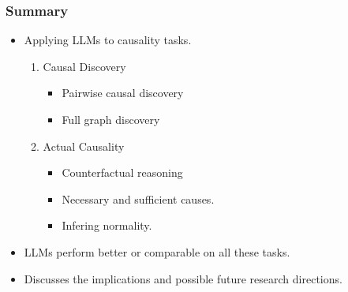 \documentclass{beamer}
\begin{document}
\begin{frame}
	\frametitle{Summary}
	\begin{itemize}
		\item Applying LLMs to causality tasks.
		\begin{enumerate}
			\item Causal Discovery
				\begin{itemize}
					\item Pairwise causal discovery
					\item Full graph discovery
				\end{itemize}
			\item Actual Causality
				\begin{itemize}
					\item Counterfactual reasoning
					\item Necessary and sufficient causes.
					\item Infering normality.
				\end{itemize}
		\end{enumerate}
		\item LLMs perform better or comparable on all these tasks. 
		\item Discusses the implications and possible future research
			directions.
	\end{itemize}
\end{frame}
\end{document}
